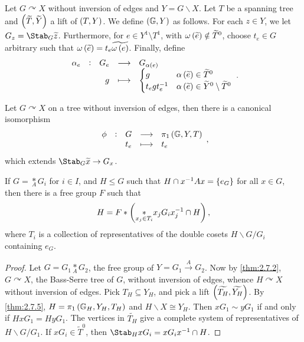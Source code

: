 \begin{definition}
Let $ G \curvearrowright X $ without inversion of edges and $ Y = G \backslash X $. Let $ T $ be a spanning tree and $ \br{\widetilde{T}, \widetilde{Y}} $ a lift of $ \br{T, Y} $. We define $ \br{\GG, Y} $ as follows. For each $ z \in Y $, we let $ G_z = \Stab_G \widetilde{z} $. Furthermore, for $ e \in Y^1 \setminus T^1 $, with $ \omega\br{\widetilde{e}} \notin \widetilde{T}^0 $, choose $ t_e \in G $ arbitrary such that $ \omega\br{\widetilde{e}} = t_e\widetilde{\omega\br{e}} $. Finally, define
$$ \function[\alpha_e]{G_e}{G_{\alpha\br{e}}}{g}{
\begin{cases}
g & \alpha\br{\widetilde{e}} \in \widetilde{T}^0 \\
t_egt_e^{-1} & \alpha\br{\widetilde{e}} \in \widetilde{Y}^0 \setminus \widetilde{T}^0
\end{cases}
}. $$
\end{definition}

\begin{theorem}
\label{thm:2.7.5}
Let $ G \curvearrowright X $ on a tree without inversion of edges, then there is a canonical isomorphism
$$ \function[\phi]{G}{\pi_1\br{\GG, Y, T}}{t_e}{t_e}, $$
which extends $ \Stab_G \widetilde{x} \to G_x $.
\end{theorem}

\begin{theorem}
If $ G = \underset{A}{*} G_i $ for $ i \in I $, and $ H \le G $ such that $ H \cap x^{-1}Ax = \cbr{e_G} $ for all $ x \in G $, then there is a free group $ F $ such that
$$ H = F * \br{\underset{x_j \in T_i}{*} x_jG_ix_j^{-1} \cap H}, $$
where $ T_i $ is a collection of representatives of the double cosets $ H \backslash G / G_i $ containing $ e_G $.
\end{theorem}

\begin{proof}
Let $ G = G_1 \underset{A}{*} G_2 $, the free group of $ Y = G_1 \xrightarrow{A} G_2 $. Now by \ref{thm:2.7.2}, $ G \curvearrowright X $, the Bass-Serre tree of $ G $, without inversion of edges, whence $ H \curvearrowright X $ without inversion of edges. Pick $ T_H \subseteq Y_H $, and pick a lift $ \br{\widetilde{T_H}, \widetilde{Y_H}} $. By \ref{thm:2.7.5}, $ H = \pi_1\br{\GG_H, Y_H, T_H} $ and $ H \backslash X \cong Y_H $. Then $ xG_1 \sim yG_1 $ if and only if $ HxG_1 = HyG_1 $. The vertices in $ \widetilde{T_H} $ give a complete system of representatives of $ H \backslash G / G_1 $. If $ xG_i \in \widetilde{T}^0 $, then $ \Stab_H xG_i = xG_ix^{-1} \cap H $.
\end{proof}

